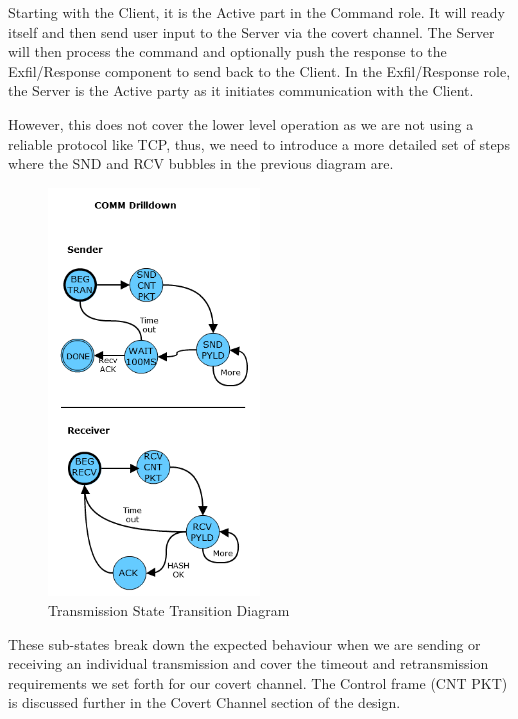 \documentclass[titlepage]{article}
\begin{document}
Starting with the Client, it is the Active part in the Command role. It will ready itself and then send user input to the Server via the covert channel. The Server will then process
the command and optionally push the response to the Exfil/Response component to send back to the Client. In the Exfil/Response role, the Server is the Active party as it
initiates communication with the Client.

\clearpage

However, this does not cover the lower level operation as we are not using a reliable protocol like TCP, thus, we need to introduce a more detailed set of steps where the SND and RCV
bubbles in the previous diagram are.

\begin{figure}[htb]                                                                       
  \begin{center}
    \includegraphics[width=0.5\textwidth]{imgs/comm.png}
  \end{center}
  \caption{Transmission State Transition Diagram}
  \label{fig:comm}
\end{figure}

These sub-states break down the expected behaviour when we are sending or receiving an individual transmission and cover the timeout and retransmission requirements we set
forth for our covert channel. The Control frame (CNT PKT) is discussed further in the Covert Channel section of the design.
\end{document}
